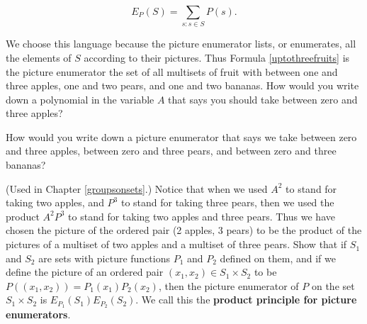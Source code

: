 $$E_P(S) = \sum_{s: s\in S}  P(s).$$

We choose this language because the picture enumerator lists, or
enumerates, all the elements of $S$ according to their pictures.  Thus
Formula \ref{uptothreefruits} is the picture enumerator the set of all
multisets of fruit with between one and three apples, one and two pears,
and one and two bananas.
\bp
\itemm How would you write down a polynomial in the variable $A$ that says
you should take between zero and three apples?
\label{zerotothreeapples}

\iteme How would you write down a picture enumerator that says we take
between zero and three apples, between zero and three pears, and between
zero and three bananas?\label{zerotothreefruits} 

\itemes (Used in Chapter \ref{groupsonsets}.) Notice that when we used $A^2$ to
stand for taking two apples, and
$P^3$ to stand for taking three pears, then we used the product
$A^2P^3$ to stand for taking two apples and three pears.  Thus we have
chosen the picture of the ordered pair (2 apples, 3 pears) to be the
product of the pictures of a multiset of two apples and a multiset of
three pears.  Show that if $S_1$ and $S_2$ are sets with picture
functions $P_1$ and $P_2$ defined on them, and if we define the picture
of an ordered pair $(x_1,x_2)\in S_1\times S_2$ to be
$P((x_1,x_2))= P_1(x_1)P_2(x_2)$, then the picture enumerator of $P$ on
the set $S_1\times S_2$ is $E_{P_1}(S_1)E_{P_2}(S_2)$.  We call this the
{\bf product principle for picture enumerators}.
\ep
